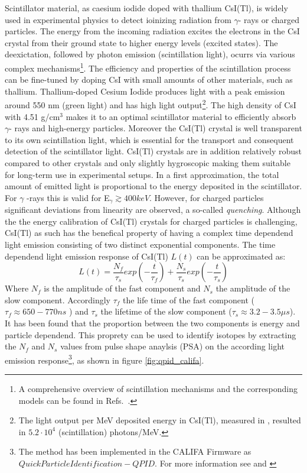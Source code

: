 Scintillator material, as caesium iodide doped with thallium CsI(Tl), is widely used in experimental physics to detect ioinizing radiation from $\gamma$- rays or charged particles. The energy from the incoming radiation excites the electrons in the CsI crystal from their ground state to higher energy levels (excited states). The deexictation, followed by photon emission (scintillation light), ocurrs via various complex mechanisms\footnote{A comprehensive overview of scintillation mechanisms and the corresponding models can be found in Refs.~\cite{murray1961scintillation,zazubovich2001physics,bendel2014entwicklung}.}. The efficiency and properties of the scintillation process can be fine-tuned by doping CsI with small amounts of other materials, such as thallium. Thallium-doped Cesium Iodide produces light with a peak emission around 550 nm (green light) and has high light output\footnote{The light output per MeV deposited energy in CsI(Tl), measured in \cite{holl1988measurement}, resulted in  $5.2\cdot10^{4}$ (scintillation) photons/MeV.}. The high density of CsI with 4.51 g/cm$^3$ makes it to an optimal scintillator material to efficiently absorb $\gamma$- rays and high-energy particles. Moreover the CsI(Tl) crystal is well transparent to its own scintillation light, which is essential for the transport and consequent  detection of the scintillator light. CsI(Tl) crystals are in addition relatively robust compared to other crystals and only slightly hygroscopic making them suitable for long-term use in experimental setups.\newline
In a first approximation, the total amount of emitted light is proportional to the energy deposited in the scintillator. For $\gamma$ -rays this is valid for E$_{\gamma} \gtrsim 400 keV$\cite{syntfeld2007non}. However, for charged particles significant deviations from linearity are observed, a so-called \textit{quenching}\cite{murray1961scintillation}.\newline
Although the the energy calibration of CsI(Tl) crystals for charged particles is challenging, CsI(Tl) as such  has the benefical property of having a complex time dependend light emission consisting of two distinct exponential components. The time dependend light emission response of CsI(Tl) $L(t)$ can be approximated as:
\begin{equation}
L(t) = \frac{N_f}{\tau_s} exp(-\frac{t}{\tau_f}) + \frac{N_s}{\tau_s} exp(-\frac{t}{\tau_s})
\end{equation}
Where $N_{f}$ is the amplitude of the fast component and $N_{s}$ the amplitude of the slow component. Accordingly $\tau_{f}$ the life time of the fast component ($\tau_{f} \approx 650-770 ns$ ) and $\tau_{s}$ the lifetime of the slow component ($\tau_{s} \approx 3.2 - 3.5\mu s$). It has been found that the proportion between the two components is energy and particle dependend. This proprety can be used to identify isotopes by extracting the $N_{f}$ and $N_{s}$ values from pulse shape anaylsis (PSA) on the according light emission response\footnote{The method has been implemented in the CALIFA Firmware as $Quick Particle Identification -QPID$. For more information see \cite{winkel2011implementierung} and \cite{winkel2016komplexe}}, as shown in figure \ref{fig:qpid_califa}.\newline  
